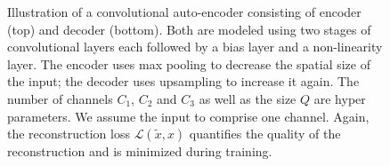 \documentclass[twoside,11pt,a4paper]{article}
\begin{document}
\begin{figure}
  \caption{Illustration of a convolutional auto-encoder consisting of encoder (top)
  and decoder (bottom). Both are modeled using two stages of convolutional
  layers each followed by a bias layer and a non-linearity layer. The encoder uses
  max pooling to decrease the spatial size of the input; the decoder uses upsampling
  to increase it again. The number of channels $C_1$, $C_2$ and $C_3$ as well as
  the size $Q$ are hyper parameters. We assume the input to comprise one channel.
  Again, the reconstruction loss $\mathcal{L}(\tilde{x}, x)$ quantifies the quality of
  the reconstruction and is minimized during training.}
  \label{fig:deep-learning-convolutional-auto-encoder}
\end{figure}
 
\end{document}
